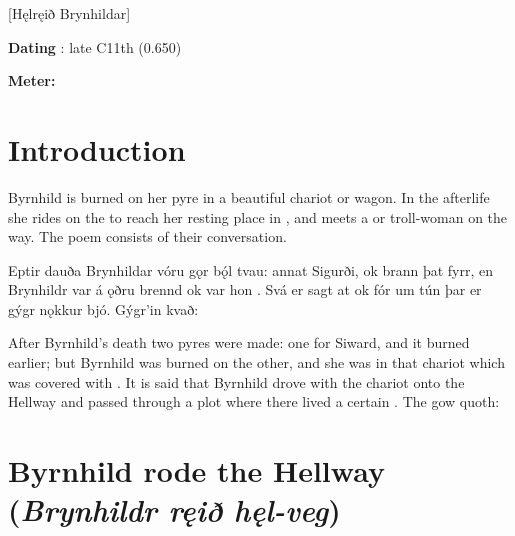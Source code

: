 [Hęlręið Brynhildar]

\begin{flushright}%
\textbf{Dating} \parencite{Sapp2022}: late C11th (0.650)

\textbf{Meter:} \Fornyrdislag
\end{flushright}%

\section{Introduction}

{\small Byrnhild is burned on her pyre in a beautiful chariot or wagon.  In the afterlife she rides on the  to reach her resting place in , and meets a  or troll-woman on the way.  The poem consists of their conversation.}

\sectionline

\bpg\bpa Eptir dauða Brynhildar vóru gǫr bǫ́l tvau: annat Sigurði, ok brann þat fyrr, en Brynhildr var á ǫðru brennd ok var hon .  Svá er sagt at  ok fór um tún þar er gýgr nǫkkur bjó.  Gýgr’in kvað:\epa

\bpb After Byrnhild’s death two pyres were made: one for Siward, and it burned earlier; but Byrnhild was burned on the other, and she was in that chariot which was covered with .  It is said that Byrnhild drove with the chariot onto the Hellway and passed through a plot where there lived a certain . The gow quoth:\epb\epg

\section{Byrnhild rode the Hellway (\emph{Brynhildr ręið hęl-veg})}

